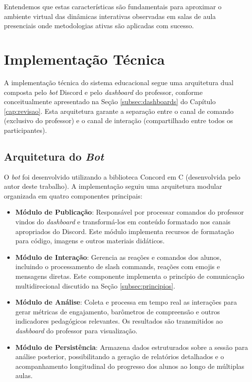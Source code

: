 Entendemos que estas características são fundamentais para aproximar o ambiente
virtual das dinâmicas interativas observadas em salas de aula presenciais onde
metodologias ativas são aplicadas com sucesso.

\section{Implementação Técnica}
\label{sec:implementacao}

A implementação técnica do sistema educacional segue uma arquitetura dual
composta pelo \textit{bot} Discord e pelo \textit{dashboard} do professor,
conforme conceitualmente apresentado na Seção \ref{subsec:dashboards} do
Capítulo \ref{cap:revisao}. Esta arquitetura garante a separação entre o canal
de comando (exclusivo do professor) e o canal de interação (compartilhado entre
todos os participantes).

\subsection{Arquitetura do \textit{Bot}}

O \textit{bot} foi desenvolvido utilizando a biblioteca Concord em C
(desenvolvida pelo autor deste trabalho). A implementação seguiu uma arquitetura
modular organizada em quatro componentes principais:

\begin{itemize}
\item \textbf{Módulo de Publicação}: Responsável por processar comandos do
professor vindos do \textit{dashboard} e transformá-los em conteúdo formatado
nos canais apropriados do Discord. Este módulo implementa recursos de formatação
para código, imagens e outros materiais didáticos.
\item \textbf{Módulo de Interação}: Gerencia as reações e comandos dos alunos,
incluindo o processamento de slash commands, reações com emojis e mensagens
diretas. Este componente implementa o princípio de comunicação multidirecional
discutido na Seção \ref{subsec:principios}.
\item \textbf{Módulo de Análise}: Coleta e processa em tempo real as interações
para gerar métricas de engajamento, barômetros de compreensão e outros
indicadores pedagógicos relevantes. Os resultados são transmitidos ao
\textit{dashboard} do professor para visualização.
\item \textbf{Módulo de Persistência}: Armazena dados estruturados sobre a
sessão para análise posterior, possibilitando a geração de relatórios detalhados
e o acompanhamento longitudinal do progresso dos alunos ao longo de múltiplas
aulas.
\end{itemize}

